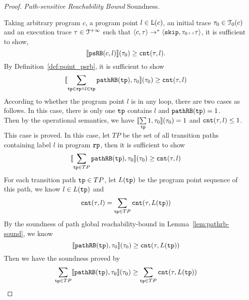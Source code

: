 \begin{proof} \emph{Path-sensitive Reachability Bound} Soundness.

    Taking arbitrary program $c$, a program point $l \in \mathtt{L}(c)$, an initial trace $\mathtt{\tau}_0 \in \mathcal{T}_0(c)$ and an execution trace $\mathtt{\tau} \in \mathcal{T}^{+\infty}$
    such that $\langle {c}, \mathtt{\tau} \rangle \to^{*} \langle \mathtt{skip}, \mathtt{\tau}_0 {\scriptscriptstyle ++} \mathtt{\tau} \rangle$,
    it is sufficient to show,
    \[
    \llbracket \mathtt{psRB}(c, l) \rrbracket(\mathtt{\tau}_0) \geq \mathtt{cnt}(\mathtt{\tau}, l) .
    \]
    By Definition~\ref{def:point_psrb}, it is sufficient to show 
    \[
    \llbracket \sum\limits_{\mathtt{tp} \in \mathtt{rp} \land  l \in \mathtt{tp}} \mathtt{pathRB}(\mathtt{tp}), \mathtt{\tau}_0 \rrbracket(\mathtt{\tau}_0)  \geq  \mathtt{cnt}(\mathtt{\tau}, l)
    \]
    According to whether the program point $l$ is in any loop, there are two cases as follows.
    In this case, there is only one $\mathtt{tp}$ contains $l$ and $\mathtt{pathRB}(\mathtt{tp}) = 1$.
    \\
    Then by the operational semantics, we have $\llbracket \sum\limits_{\mathtt{tp}} 1, \mathtt{\tau}_0 \rrbracket(\mathtt{\tau}_0) =  1$ and $ \mathtt{cnt}(\mathtt{\tau}, l) \leq 1$.
    \\
    This case is proved.
    In this case, let $TP$ be the set of all transition paths containing 
    label $l$ in program $\mathtt{rp}$, then it is sufficient to show 
    \[
        \llbracket \sum\limits_{\mathtt{tp} \in TP} \mathtt{pathRB}(\mathtt{tp}), \mathtt{\tau}_0 \rrbracket(\mathtt{\tau}_0)  \geq  \mathtt{cnt}(\mathtt{\tau}, l)
    \]
    For each transition path $\mathtt{tp} \in TP$, let $L(\mathtt{tp})$ be the program point sequence of this path, we know $l \in L(\mathtt{tp})$
    and 
    \[
        \mathtt{cnt}(\mathtt{\tau}, l) = \sum\limits_{\mathtt{tp} \in TP} \mathtt{cnt}(\mathtt{\tau}, L(\mathtt{tp}))
    \]
    By the soundness of path global reachability-bound in Lemma~\ref{lem:pathrb-sound}, we know
    \[
        \llbracket \mathtt{pathRB}(\mathtt{tp}), \mathtt{\tau}_0 \rrbracket(\mathtt{\tau}_0)  \geq  \mathtt{cnt}(\mathtt{\tau}, L(\mathtt{tp}))
    \]
    Then we have the soundness proved by
    \[
        \sum\limits_{\mathtt{tp} \in TP} \llbracket \mathtt{pathRB}(\mathtt{tp}), \mathtt{\tau}_0 \rrbracket(\mathtt{\tau}_0)  \geq \sum\limits_{\mathtt{tp} \in TP}  \mathtt{cnt}(\mathtt{\tau}, L(\mathtt{tp}))
    \]
\end{proof}
  
